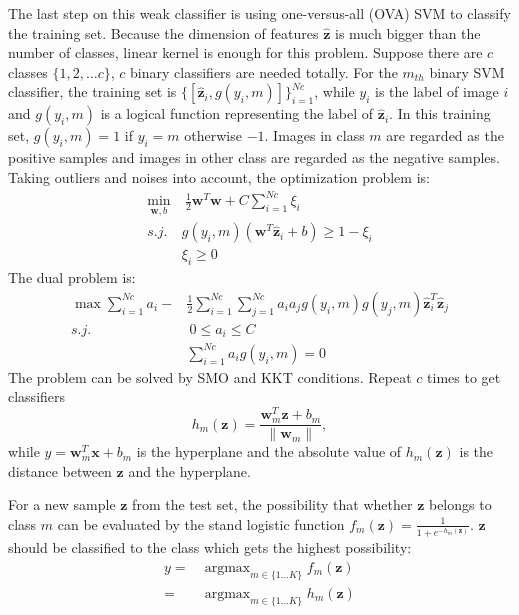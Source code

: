 \documentclass[conference]{IEEEtran}
\DeclareMathOperator*{\argmax}{argmax}
\begin{document}
The last step on this weak classifier is using one-versus-all (OVA) SVM\cite{ova} to classify the training set. Because the dimension of features $\hat{\mathbf{z}}$ is much bigger than the number of classes, linear kernel is enough for this problem. Suppose there are $c$ classes $\{1,2,\dots c\}$, $c$ binary classifiers are needed totally. For the $m_{th}$ binary SVM classifier, the training set is $\{[\hat{\mathbf{z}}_i, g(y_i,m)]\}_{i=1}^{Nc}$, while $y_i$ is the label of image $i$ and $g(y_i , m)$ is a logical function representing the label of $\hat{\mathbf{z}}_i$. In this training set, $g(y_i,m)=1$ if $y_i = m$ otherwise $-1$.  Images in class $m$ are regarded as the positive samples and images in other class are regarded as the negative samples. Taking outliers and noises into account, the optimization problem is:
\begin{align}
	\min_{\mathbf{w},b} &\ \frac{1}{2}\mathbf{w}^T\mathbf{w} + C \sum\limits_{i=1}^{Nc}\xi_i\\
	s.j.\ & g(y_i , m)(\mathbf{w}^T\hat{\mathbf{z}}_i+b)\geq 1-\xi_i\\
	& \xi_i\geq 0
\end{align}
The dual problem is:
\begin{align}
	\max  \sum\limits_{i=1}^{Nc}a_i - &\frac{1}{2}\sum\limits_{i=1}^{Nc}\sum\limits_{j=1}^{Nc}a_ia_jg(y_i , m)g(y_j,m)\hat{\mathbf{z}}_i^T\hat{\mathbf{z}}_j\\
	 s.j. &\ 0\leq	a_i\leq C\\
	 & \sum\limits_{i=1}^{Nc}a_ig(y_i, m) = 0
\end{align}
The problem can be solved by SMO and KKT conditions. Repeat $c$ times to get classifiers 
\begin{equation}
	h_m(\mathbf{z}) = \frac{\mathbf{w}_m^T\mathbf{z}+b_m}{\|\mathbf{w}_m\|},
\end{equation}
while $y = \mathbf{w}_m^T\mathbf{x}+b_m$ is the hyperplane and the absolute value of $h_m(\mathbf{z})$ is the distance between $\mathbf{z}$ and the hyperplane.

For a new sample $\mathbf{z}$ from the test set, the possibility that whether $\mathbf{z}$ belongs to class $m$ can be evaluated by the stand logistic function $f_m(\mathbf{z}) = \frac{1}{1+e^{-h_m(\mathbf{z})}} $. $\mathbf{z}$ should be classified to the class which gets the highest possibility:
\begin{align}
	y =& \argmax_{m \in \{1\dots K\}} f_m(\mathbf{z})\\
		= & \argmax_{m \in \{1\dots K\}} h_m(\mathbf{z})
\end{align}
\end{document}

